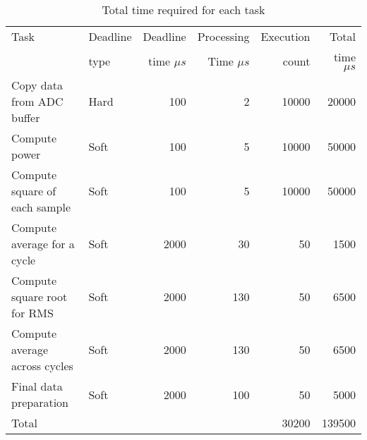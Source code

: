 \begin{table}[htb]
	\centering
	\caption{Total time required for each task}
	\begin{tabular}{@{}llrrrr@{}}
		 Task  &  Deadline  &  Deadline  &  Processing  &  Execution  &  Total \\
		  &  type  &  time $\mu s$ &  Time $\mu s$ &  count  &  time $\mu s$ \\
	\midrule
		Copy data from ADC buffer  &  Hard              & 100 & 2 & 10000 & 20000 \\
		Compute power                &  Soft              & 100 & 5 & 10000 & 50000 \\
		Compute  square of each sample              &  Soft              & 100 & 5 & 10000 & 50000 \\
		Compute average for a cycle  &  Soft              & 2000 & 30 & 50 & 1500 \\
		Compute square root for RMS  &  Soft              & 2000 & 130 & 50 & 6500 \\
		Compute   average across cycles       &  Soft              & 2000 & 130 & 50 & 6500 \\
		Final   data preparation  &  Soft              & 2000 & 100 & 50 & 5000 \\
		Total  &   &   &   & 30200 & 139500 \\
	\bottomrule
	\end{tabular}
	\label{tab:taskTimeRequirement}
\end{table}
